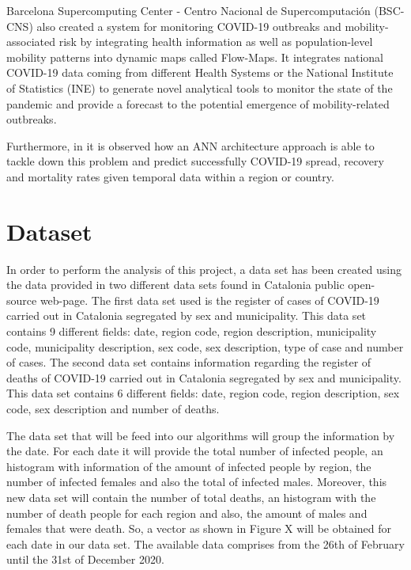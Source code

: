 \documentclass[anon]{CI}
\begin{document}
Barcelona Supercomputing Center - Centro Nacional de Supercomputación (BSC-CNS) also created a system for monitoring COVID-19 outbreaks and mobility-associated risk by integrating health information as well as population-level mobility patterns into dynamic maps called Flow-Maps. It integrates national COVID-19 data coming from different Health Systems or the National Institute of Statistics (INE) to generate novel analytical tools to monitor the state of the pandemic and provide a forecast to the potential emergence of mobility-related outbreaks.

Furthermore, in \cite{COVIDANN} it is observed how an ANN architecture approach is able to tackle down this problem and predict successfully COVID-19 spread, recovery and mortality rates given temporal data within a region or country.

\section{Dataset}

In order to perform the analysis of this project, a data set has been created using the data provided in two different data sets found in Catalonia public open-source web-page.
The first data set used is the register of cases of COVID-19 carried out in Catalonia segregated by sex and municipality. This data set contains 9 different fields: date, region code, region description, municipality code, municipality description, sex code, sex description, type of case and number of cases. 
The second data set contains information regarding the register of deaths of COVID-19 carried out in Catalonia segregated by sex and municipality. This data set contains 6 different fields: date, region code, region description, sex code, sex description and number of deaths.

The data set that will be feed into our algorithms will group the information by the date. For each date it will provide the total number of infected people, an histogram with information of the amount of infected people by region, the number of infected females and also the total of infected males. Moreover, this new data set will contain the number of total deaths, an histogram with the number of death people for each region and also, the amount of males and females that were death. So, a vector as shown in Figure X will be obtained for each date in our data set. The available data comprises from the 26th of February until the 31st of December 2020.
\end{document}
